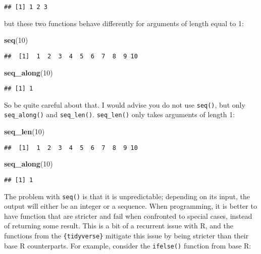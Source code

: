 \documentclass[
]{article}
\newenvironment{Shaded}{\begin{snugshade}}{\end{snugshade}}
\newcommand{\DecValTok}[1]{\textcolor[rgb]{0.00,0.00,0.81}{#1}}
\newcommand{\KeywordTok}[1]{\textcolor[rgb]{0.13,0.29,0.53}{\textbf{#1}}}
\newcommand{\NormalTok}[1]{#1}
\begin{document}
\begin{verbatim}
## [1] 1 2 3
\end{verbatim}

but these two functions behave differently for arguments of length equal to 1:

\begin{Shaded}
\begin{Highlighting}[]
\KeywordTok{seq}\NormalTok{(}\DecValTok{10}\NormalTok{)}
\end{Highlighting}
\end{Shaded}

\begin{verbatim}
##  [1]  1  2  3  4  5  6  7  8  9 10
\end{verbatim}

\begin{Shaded}
\begin{Highlighting}[]
\KeywordTok{seq\_along}\NormalTok{(}\DecValTok{10}\NormalTok{)}
\end{Highlighting}
\end{Shaded}

\begin{verbatim}
## [1] 1
\end{verbatim}

So be quite careful about that. I would advise you do not use \texttt{seq()}, but only \texttt{seq\_along()} and \texttt{seq\_len()}. \texttt{seq\_len()}
only takes arguments of length 1:

\begin{Shaded}
\begin{Highlighting}[]
\KeywordTok{seq\_len}\NormalTok{(}\DecValTok{10}\NormalTok{)}
\end{Highlighting}
\end{Shaded}

\begin{verbatim}
##  [1]  1  2  3  4  5  6  7  8  9 10
\end{verbatim}

\begin{Shaded}
\begin{Highlighting}[]
\KeywordTok{seq\_along}\NormalTok{(}\DecValTok{10}\NormalTok{)}
\end{Highlighting}
\end{Shaded}

\begin{verbatim}
## [1] 1
\end{verbatim}

The problem with \texttt{seq()} is that it is unpredictable; depending on its input, the output will either be an integer or a sequence.
When programming, it is better to have function that are stricter and fail when confronted to special cases, instead of returning
some result. This is a bit of a recurrent issue with R, and the functions from the \texttt{\{tidyverse\}} mitigate this issue by being
stricter than their base R counterparts. For example, consider the \texttt{ifelse()} function from base R:
\end{document}
